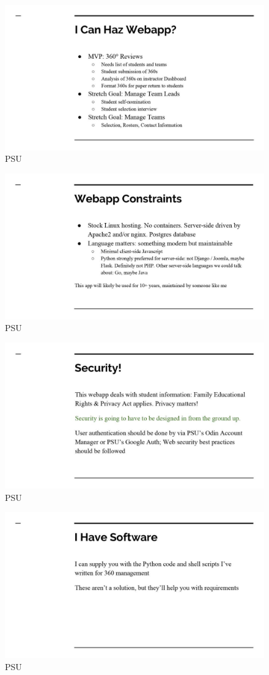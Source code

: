 \begin{figure}[h!]
\centering
\includegraphics[width=0.8\linewidth]{P5-c.jpg}
\caption[PSU]{PSU}
\label{fig:PSU}
\end{figure}	


\begin{figure}[h!]
\centering
\includegraphics[width=0.8\linewidth]{P5-d.jpg}
\caption[PSU]{PSU}
\label{fig:PSU}
\end{figure}	
\newpage
\begin{figure}[h!]
\centering
\includegraphics[width=0.8\linewidth]{P5-e.jpg}
\caption[PSU]{PSU}
\label{fig:PSU}
\end{figure}	

\begin{figure}[h!]
\centering
\includegraphics[width=0.8\linewidth]{P5-f.jpg}
\caption[PSU]{PSU}
\label{fig:PSU}
\end{figure}	
